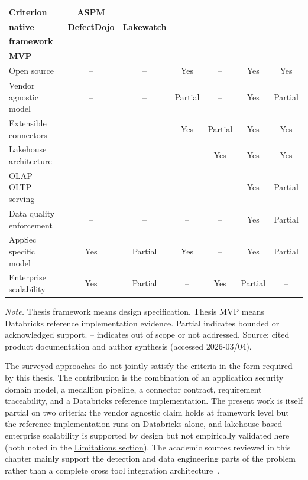 \begin{center}
\begin{minipage}{\textwidth}
\label{tab:related-work-comparison}
\scriptsize
\begin{tabularx}{\textwidth}{>{\raggedright\arraybackslash}X c c c c c c}
\toprule
\textbf{Criterion} & \textbf{ASPM} & \shortstack{\textbf{Platform}\\\textbf{native}} & \textbf{DefectDojo} & \textbf{Lakewatch} & \shortstack{\textbf{Thesis}\\\textbf{framework}} & \shortstack{\textbf{Thesis}\\\textbf{MVP}} \\
\midrule
Open source              & --      & --      & Yes     & --      & Yes     & Yes \\
Vendor agnostic model    & --      & --      & Partial & --      & Yes     & Partial \\
Extensible connectors    & --      & --      & Yes     & Partial & Yes     & Yes \\
Lakehouse architecture   & --      & --      & --      & Yes     & Yes     & Yes \\
OLAP + OLTP serving      & --      & --      & --      & --      & Yes     & Partial \\
Data quality enforcement & --      & --      & --      & --      & Yes     & Partial \\
AppSec specific model    & Yes     & Partial & Yes     & --      & Yes     & Partial \\
Enterprise scalability   & Yes     & Partial & --      & Yes     & Partial & -- \\
\bottomrule
\end{tabularx}
\par\footnotesize \textit{Note.} Thesis framework means design specification. Thesis MVP means Databricks reference implementation evidence. Partial indicates bounded or acknowledged support. -- indicates out of scope or not addressed. Source: cited product documentation and author synthesis (accessed 2026-03/04).
\end{minipage}
\end{center}

The surveyed approaches do not jointly satisfy the criteria in the form required by this thesis. The contribution is the combination of an application security domain model, a medallion pipeline, a connector contract, requirement traceability, and a Databricks reference implementation. The present work is itself partial on two criteria: the vendor agnostic claim holds at framework level but the reference implementation runs on Databricks alone, and lakehouse based enterprise scalability is supported by design but not empirically validated here (both noted in the \hyperref[sec:conclusion-limitations]{Limitations section}). The academic sources reviewed in this chapter mainly support the detection and data engineering parts of the problem rather than a complete cross tool integration architecture~\cite{Chess2007, McGraw2006, Stuttard2011, Reis2022, Strengholt2025}.

